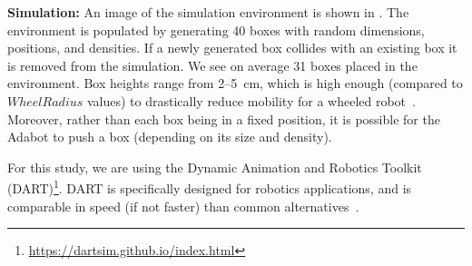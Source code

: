 \noindent
\textbf{Simulation:}
%
%
An image of the simulation environment is shown in .
%
The environment is populated by generating 40 boxes with random dimensions, positions, and densities.
%
If a newly generated box collides with an existing box it is removed from the simulation. We see on average 31 boxes placed in the environment.
%
Box heights range from \numrange{2}{5}~\si{cm}, which is high enough (compared to $\mathit{WheelRadius}$ values) to drastically reduce mobility for a wheeled robot~\citep{Quinn.2003.IJRR.ParallelComplementaryStrategies}.
%
Moreover, rather than each box being in a fixed position, it is possible for the Adabot to push a box (depending on its size and density).


For this study, we are using the Dynamic Animation and Robotics Toolkit (DART)\footnote{\url{https://dartsim.github.io/index.html}}.
%
DART is specifically designed for robotics applications,
and is comparable in speed (if not faster) than common alternatives~\citep{Mouret.2017.SimER.Simulation}.
%
%


